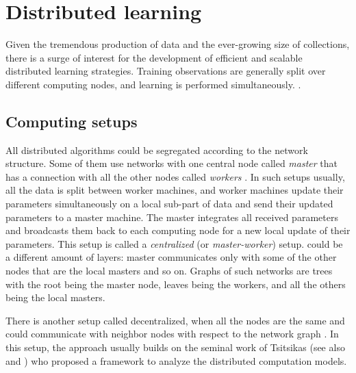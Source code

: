 \section{Distributed learning}\label{sec:distributed-intro}
Given the tremendous production of data and the ever-growing size of collections, there is a surge of interest
for the development of efficient and scalable distributed learning strategies.  Training observations are generally split over different computing nodes, and learning is performed simultaneously. .%

\subsection{Computing setups}\label{sec:basics_dist-set}
All distributed algorithms could be segregated according to the network structure. Some of them use networks with one central node called \emph{master} that has a connection with all the other nodes called \emph{workers} \cite{konevcny2016federated,konevcny2016federated2,mishchenko2018}. In such setups usually, all the data is split between worker machines, and worker machines update their parameters simultaneously on a local sub-part of data and send their updated parameters to a master machine. The master integrates all received parameters and broadcasts them back to each computing node for a new local update of their parameters. This setup is called a \emph{centralized} (or \emph{master-worker}) setup.  could be a different amount of layers: master communicates only with some of the other nodes that are the local masters and so on. Graphs of such networks are trees with the root being the master node, leaves being the workers, and all the others being the local masters.

There is another setup called decentralized, when all the nodes are the same and could communicate with neighbor nodes with respect to the network graph \cite{nedic2009distributed, boyd2011distributed, duchi2011dual, shi2015extra}. In this setup, the approach usually builds on the seminal work of Tsitsikas \cite{tsitsiklis1984problems} (see also \cite{bertsekas1997parallel} and \cite{tsitsiklis1986distributed}) who proposed a framework to analyze the distributed computation models.%

